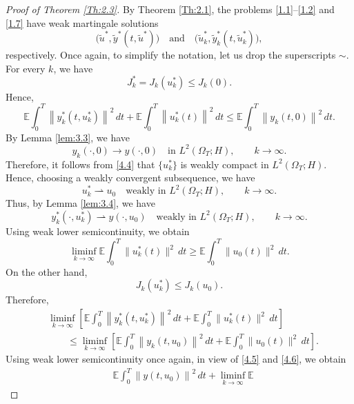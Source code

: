 \documentclass[a4paper,12pt]{article}
\numberwithin{equation}{section}
\begin{document}
\begin{proof}[Proof of Theorem \ref{Th:2.3}]
By Theorem \ref{Th:2.1}, the problems \eqref{1.1}--\eqref{1.2} and \eqref{1.7}
have weak martingale solutions
\[
\bigl(
\widetilde{u}^*,
\widetilde{y}^*(t,\widetilde{u}^*)
\bigr)
\quad\text{and}\quad
\bigl(
\widetilde{u}_k^*,
\widetilde{y}_k^*(t,\widetilde{u}_k^*)
\bigr),
\]
respectively. Once again, to simplify the notation, let us drop the superscripts $\sim$.  For every $k$, we have
\[
J_k^*
=
J_k({u}_k^*)
\leq
J_k(0).
\]
Hence,
\begin{equation}
{\mathbb{E}}
\int_0^T
\left\|
{y}_k^*(t,{u}_k^*)
\right\|^2\,dt
+
{\mathbb{E}}
\int_0^T
\left\|
{u}_k^*(t)
\right\|^2\,dt
\leq
{\mathbb{E}}
\int_0^T
\left\|
{y}_k(t,0)
\right\|^2\,dt.
\label{4.4}
\end{equation}
By Lemma \ref{lem:3.3}, we have
\begin{equation}
{y}_k(\cdot,0)
\longrightarrow
{y}(\cdot,0)
\quad\text{in }
L^2({\Omega}_T;H),
\qquad k\to\infty.
\label{4.5}
\end{equation}
Therefore, it follows from \eqref{4.4} that
$\{u_k^*\}$ is weakly compact in
$L^2(\Omega_T;H)$. Hence, choosing a weakly convergent
subsequence, we have
\[
u_k^*
\rightharpoonup
u_0
\quad\text{weakly in }
L^2(\Omega_T;H),
\qquad k\to\infty.
\]
Thus, by Lemma \ref{lem:3.4}, we have
\begin{equation}
y_k^*(\cdot,u_k^*)
\rightharpoonup
y(\cdot,u_0)
\quad\text{weakly in }
L^2(\Omega_T;H),
\qquad k\to\infty.
\label{4.6}
\end{equation}
Using  weak lower semicontinuity, we obtain
\begin{equation}
\liminf_{k\to\infty}
\mathbb{E}
\int_0^T
\|u_k^*(t)\|^2\,dt
\geq
\mathbb{E}
\int_0^T
\|u_0(t)\|^2\,dt.
\label{4.7}
\end{equation}
On the other hand,
\[
J_k(u_k^*)
\leq
J_k(u_0).
\]
Therefore,
\[
\begin{aligned}
&\liminf_{k\to\infty}
\left[
\mathbb{E}
\int_0^T
\left\|
y_k^*(t,u_k^*)
\right\|^2\,dt
+
\mathbb{E}
\int_0^T
\|u_k^*(t)\|^2\,dt
\right]
\\
&\qquad\leq
\liminf_{k\to\infty}
\left[
\mathbb{E}
\int_0^T
\left\|
y_k(t,u_0)
\right\|^2\,dt
+
\mathbb{E}
\int_0^T
\|u_0(t)\|^2\,dt
\right].
\end{aligned}
\]
Using weak lower semicontinuity once again, in view of \eqref{4.5} and \eqref{4.6}, we obtain
\[
\begin{aligned}
&\mathbb{E}
\int_0^T
\left\|
y(t,u_0)
\right\|^2\,dt
+
\liminf_{k\to\infty}
\mathbb{E}

\end{aligned}\]
\end{proof}
\end{document}
